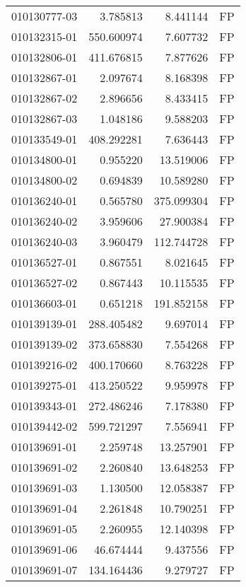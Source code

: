 \begin{tabular}{lrrl}
010130777-03 &    3.785813 &       8.441144 &   FP \\
010132315-01 &  550.600974 &       7.607732 &   FP \\
010132806-01 &  411.676815 &       7.877626 &   FP \\
010132867-01 &    2.097674 &       8.168398 &   FP \\
010132867-02 &    2.896656 &       8.433415 &   FP \\
010132867-03 &    1.048186 &       9.588203 &   FP \\
010133549-01 &  408.292281 &       7.636443 &   FP \\
010134800-01 &    0.955220 &      13.519006 &   FP \\
010134800-02 &    0.694839 &      10.589280 &   FP \\
010136240-01 &    0.565780 &     375.099304 &   FP \\
010136240-02 &    3.959606 &      27.900384 &   FP \\
010136240-03 &    3.960479 &     112.744728 &   FP \\
010136527-01 &    0.867551 &       8.021645 &   FP \\
010136527-02 &    0.867443 &      10.115535 &   FP \\
010136603-01 &    0.651218 &     191.852158 &   FP \\
010139139-01 &  288.405482 &       9.697014 &   FP \\
010139139-02 &  373.658830 &       7.554268 &   FP \\
010139216-02 &  400.170660 &       8.763228 &   FP \\
010139275-01 &  413.250522 &       9.959978 &   FP \\
010139343-01 &  272.486246 &       7.178380 &   FP \\
010139442-02 &  599.721297 &       7.556941 &   FP \\
010139691-01 &    2.259748 &      13.257901 &   FP \\
010139691-02 &    2.260840 &      13.648253 &   FP \\
010139691-03 &    1.130500 &      12.058387 &   FP \\
010139691-04 &    2.261848 &      10.790251 &   FP \\
010139691-05 &    2.260955 &      12.140398 &   FP \\
010139691-06 &   46.674444 &       9.437556 &   FP \\
010139691-07 &  134.164436 &       9.279727 &   FP \\

\end{tabular}
